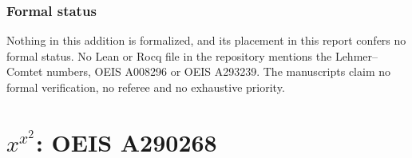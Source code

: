 \documentclass[11pt,a4paper]{article}
\numberwithin{equation}{section}
\theoremstyle{definition}
\theoremstyle{remark}
\theoremstyle{plain}
\begin{document}
\subsubsection{Formal status}\label{xx:lc:sec:formal}

Nothing in this addition is formalized, and its placement in this report
confers no formal status.  No Lean or Rocq file in the repository mentions the
Lehmer--Comtet numbers, OEIS A008296 or OEIS A293239.  The manuscripts claim no formal
verification, no referee and no exhaustive priority.

\clearpage
\section{\texorpdfstring{$x^{x^2}$}{x^(x^2)}: OEIS A290268}\label{xxb:part}
\end{document}
